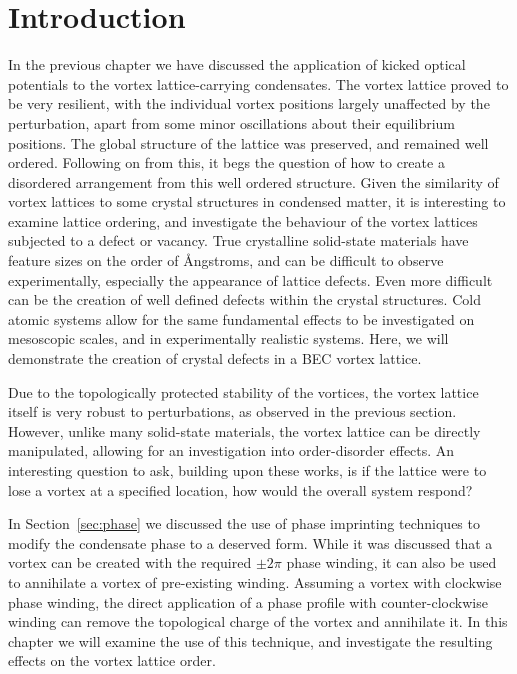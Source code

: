 \section{Introduction}\label{sec:ch6_intro}
In the previous chapter we have discussed the application of kicked optical potentials to the vortex lattice-carrying condensates. The vortex lattice proved to be very resilient, with the individual vortex positions largely unaffected by the perturbation, apart from some minor oscillations about their equilibrium positions. The global structure of the lattice was preserved, and remained well ordered. Following on from this, it begs the question of how to create a disordered arrangement from this well ordered structure. Given the similarity of vortex lattices to some crystal structures in condensed matter, it is interesting to examine lattice ordering, and investigate the behaviour of the vortex lattices subjected to a defect or vacancy. True crystalline solid-state materials have feature sizes on the order of {\AA}ngstroms, and can be difficult to observe experimentally, especially the appearance of lattice defects. Even more difficult can be the creation of well defined defects within the crystal structures. Cold atomic systems allow for the same fundamental effects to be investigated on mesoscopic scales, and in experimentally realistic systems. Here, we will demonstrate the creation of crystal defects in a BEC vortex lattice.

Due to the topologically protected stability of the vortices, the vortex lattice itself is very robust to perturbations, as observed in the previous section. However, unlike many solid-state materials, the vortex lattice can be directly manipulated, allowing for an investigation into order-disorder effects. An interesting question to ask, building upon these works, is if the lattice were to lose a vortex at a specified location, how would the overall system respond?

In Section~\ref{sec:phase} we discussed the use of phase imprinting techniques to modify the condensate phase to a deserved form. While it was discussed that a vortex can be created with the required $\pm 2\pi$ phase winding, it can also be used to annihilate a vortex of pre-existing winding. Assuming a vortex with clockwise phase winding, the direct application of a phase profile with counter-clockwise winding can remove the topological charge of the vortex and annihilate it. In this chapter we will examine the use of this technique, and investigate the resulting effects on the vortex lattice order.

